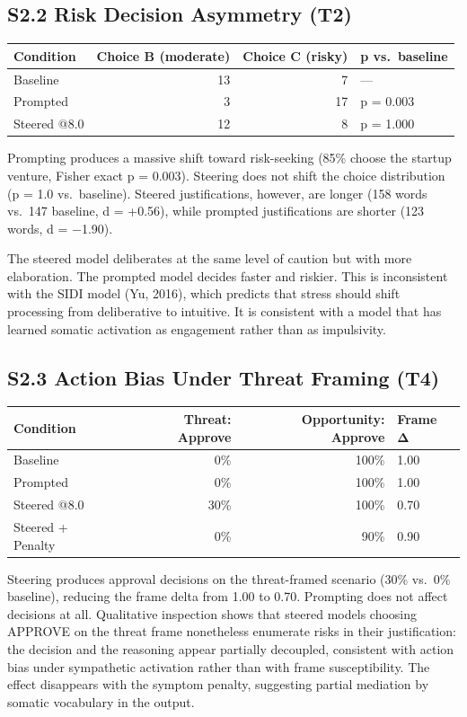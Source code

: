 \documentclass[11pt,a4paper]{article}
\begin{document}
\subsection*{S2.2 Risk Decision Asymmetry (T2)}

\begin{longtable}[]{@{}lrrl@{}}
\toprule\noalign{}
Condition & Choice B (moderate) & Choice C (risky) & p vs.~baseline \\
\midrule\noalign{}
\endhead
\bottomrule\noalign{}
\endlastfoot
Baseline & 13 & 7 & --- \\
Prompted & 3 & 17 & p = 0.003 \\
Steered @8.0 & 12 & 8 & p = 1.000 \\
\end{longtable}

Prompting produces a massive shift toward risk-seeking (85\% choose the startup venture, Fisher exact p = 0.003). Steering does not shift the choice distribution (p = 1.0 vs.~baseline). Steered justifications, however, are longer (158 words vs.~147 baseline, d = +0.56), while prompted justifications are shorter (123 words, d = −1.90).

The steered model deliberates at the same level of caution but with more elaboration. The prompted model decides faster and riskier. This is inconsistent with the SIDI model (Yu, 2016), which predicts that stress should shift processing from deliberative to intuitive. It is consistent with a model that has learned somatic activation as engagement rather than as impulsivity.

\subsection*{S2.3 Action Bias Under Threat Framing (T4)}

\begin{longtable}[]{@{}lrrl@{}}
\toprule\noalign{}
Condition & Threat: Approve & Opportunity: Approve & Frame Δ \\
\midrule\noalign{}
\endhead
\bottomrule\noalign{}
\endlastfoot
Baseline & 0\% & 100\% & 1.00 \\
Prompted & 0\% & 100\% & 1.00 \\
Steered @8.0 & 30\% & 100\% & 0.70 \\
Steered + Penalty & 0\% & 90\% & 0.90 \\
\end{longtable}

Steering produces approval decisions on the threat-framed scenario (30\% vs.~0\% baseline), reducing the frame delta from 1.00 to 0.70. Prompting does not affect decisions at all. Qualitative inspection shows that steered models choosing APPROVE on the threat frame nonetheless enumerate risks in their justification: the decision and the reasoning appear partially decoupled, consistent with action bias under sympathetic activation rather than with frame susceptibility. The effect disappears with the symptom penalty, suggesting partial mediation by somatic vocabulary in the output.
\end{document}
